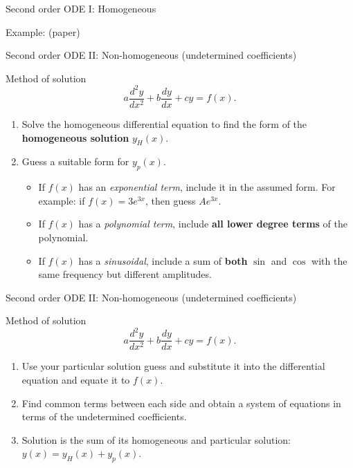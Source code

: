 \begin{frame}{Second order ODE I: Homogeneous}
    \begin{exampleblock}{Example: (paper)}
    \end{exampleblock}
\end{frame}

\begin{frame}{Second order ODE II: Non-homogeneous (undetermined coefficients)}
    \begin{block}{Method of solution}
        \[ a \frac{d^2y}{dx^2} + b \frac{dy}{dx} + cy = f(x).\]
        \pause
        \begin{enumerate}
            \item Solve the homogeneous differential equation to find the form of the \textbf{homogeneous solution} \(y_H(x)\). \pause
            
            \item Guess a suitable form for \(y_p(x)\). \pause
            \begin{itemize}
                \item If \(f(x)\) has an \textit{exponential term}, include it in the assumed form. For example: if \(f(x) = 3e^{3x}\), then guess \(Ae^{3x}\). \pause
                
                \item If \(f(x)\) has a \textit{polynomial term}, include \textbf{all lower degree terms} of the polynomial. \pause
                
                \item If \(f(x)\) has a \textit{sinusoidal}, include a sum of \textbf{both} \(\sin\) and \(\cos\) with the same frequency but different amplitudes.
            \end{itemize}
            
            \seti
        \end{enumerate}
    \end{block}
\end{frame}

\begin{frame}{Second order ODE II: Non-homogeneous (undetermined coefficients)}
    \begin{block}{Method of solution}
        \[ a \frac{d^2y}{dx^2} + b \frac{dy}{dx} + cy = f(x).\]
        \begin{enumerate}
        \conti
            
            \item Use your particular solution guess and substitute it into the differential equation and equate it to \(f(x)\). \pause
            
            \item Find common terms between each side and obtain a system of equations in terms of the undetermined coefficients. \pause
            
            \item Solution is the sum of its homogeneous and particular solution: \(\displaystyle y(x) = y_H(x) + y_p(x)\).
        \end{enumerate}
    \end{block}
\end{frame}

